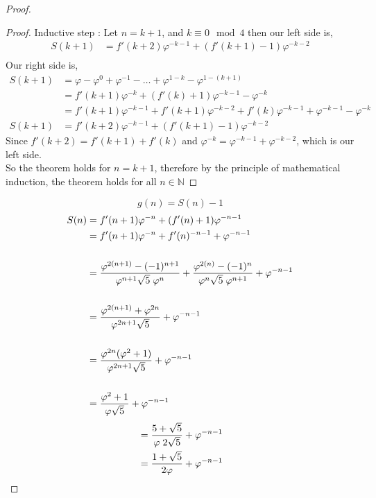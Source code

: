 \documentclass[preprint,12pt]{elsarticle}
\begin{document}
\begin{proof}
\begin{proof}
			Inductive step : Let $n = k + 1$, and $k \equiv0\mod4$ then our left side is,
			\begin{align*}
			S(k + 1) &= f'(k+2)\varphi^{-k-1} + (f'(k+1)-1)\varphi^{-k-2}\\
			\end{align*}
			Our right side is,
			\begin{align*}
			S(k + 1) &= \varphi - \varphi^0 + \varphi^{-1} - \ldots + \varphi^{1 - k} - \varphi^{1 - (k + 1)}\\
			&= f'(k + 1)\varphi^{-k} + (f'(k) + 1)\varphi^{-k-1} - \varphi^{-k}\\
			&= f'(k + 1)\varphi^{-k-1} + f'(k+1)\varphi^{-k-2}+f'(k)\varphi^{-k-1}+\varphi^{-k-1}-\varphi^{-k}\\
			S(k + 1) &= f'(k+2)\varphi^{-k-1} + (f'(k+1)-1)\varphi^{-k-2}
			\end{align*}
			Since $f'(k+2) = f'(k+1)+f'(k)$ and $\varphi^{-k} = \varphi^{-k-1}+\varphi^{-k-2}$,
			which is our left side.\\
			So the theorem holds for $n = k + 1$, therefore by the principle of mathematical induction, the theorem holds for all $n \in \mathbb{N}$
		\end{proof}
		$$g(n) = S(n) - 1$$
		\begin{align*}
		S(n) &= f'(n+1)\varphi^{-n} + (f'(n) + 1)\varphi^{-n-1}\\
		&= f'(n+1)\varphi^{-n}+f'(n)^{-n-1}+\varphi^{-n-1}\\\\
		&= \dfrac{\varphi^{2(n+1)}-(-1)^{n+1}}{\varphi^{n+1}\sqrt{5}\hspace{1mm}\varphi^n} + \dfrac{\varphi^{2(n)}-(-1)^{n}}{\varphi^{n}\sqrt{5}\hspace{1mm}\varphi^{n+1}} + \varphi^{-n-1}\\\\
		&= \dfrac{\varphi^{2(n+1)}+\varphi^{2n}}{\varphi^{2n+1}\sqrt{5}}+ \varphi^{-n-1}\\\\
		&= \dfrac{\varphi^{2n}(\varphi^2+1)}{\varphi^{2n+1}\sqrt{5}}+\varphi^{-n-1}\\\\
		&=\dfrac{\varphi^2+1}{\varphi\sqrt{5}}+\varphi^{-n-1}
		\end{align*}
		\begin{align*}
		&= \dfrac{5+\sqrt{5}}{\varphi\hspace{1mm}2\sqrt{5}}+\varphi^{-n-1}\\
		&= \dfrac{1+\sqrt{5}}{2\varphi}+\varphi^{-n-1}\\

\end{align*}
\end{proof}
\end{document}

